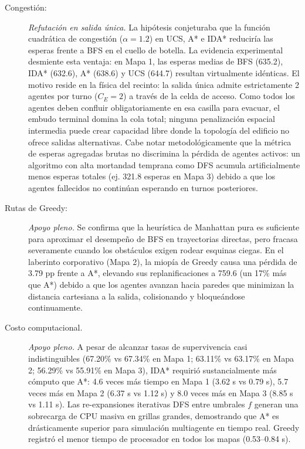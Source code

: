 \documentclass[11pt,letterpaper]{article}
\begin{document}
\begin{description}
\item[Congestión:] \textit{Refutación en salida única.} La hipótesis conjeturaba que la función cuadrática de congestión ($\alpha=1.2$) en UCS, A* e IDA* reduciría las esperas frente a BFS en el cuello de botella. La evidencia experimental desmiente esta ventaja: en Mapa 1, las esperas medias de BFS (635.2), IDA* (632.6), A* (638.6) y UCS (644.7) resultan virtualmente idénticas. El motivo reside en la física del recinto: la salida única admite estrictamente 2 agentes por turno ($C_E=2$) a través de la celda de acceso. Como todos los agentes deben confluir obligatoriamente en esa casilla para evacuar, el embudo terminal domina la cola total; ninguna penalización espacial intermedia puede crear capacidad libre donde la topología del edificio no ofrece salidas alternativas. Cabe notar metodológicamente que la métrica de esperas agregadas brutas no discrimina la pérdida de agentes activos: un algoritmo con alta mortandad temprana como DFS acumula artificialmente menos esperas totales (ej. 321.8 esperas en Mapa 3) debido a que los agentes fallecidos no continúan esperando en turnos posteriores.

\item[Rutas de Greedy:] \textit{Apoyo pleno.} Se confirma que la heurística de Manhattan pura es suficiente para aproximar el desempeño de BFS en trayectorias directas, pero fracasa severamente cuando los obstáculos exigen rodear esquinas ciegas. En el laberinto corporativo (Mapa 2), la miopía de Greedy causa una pérdida de 3.79 pp frente a A*, elevando sus replanificaciones a 759.6 (un 17\% más que A*) debido a que los agentes avanzan hacia paredes que minimizan la distancia cartesiana a la salida, colisionando y bloqueándose continuamente.

\item[Costo computacional.] \textit{Apoyo pleno.} A pesar de alcanzar tasas de supervivencia casi indistinguibles (67.20\% vs 67.34\% en Mapa 1; 63.11\% vs 63.17\% en Mapa 2; 56.29\% vs 55.91\% en Mapa 3), IDA* requirió sustancialmente más cómputo que A*: 4.6 veces más tiempo en Mapa 1 (3.62 s vs 0.79 s), 5.7 veces más en Mapa 2 (6.37 s vs 1.12 s) y 8.0 veces más en Mapa 3 (8.85 s vs 1.11 s). Las re-expansiones iterativas DFS entre umbrales $f$ generan una sobrecarga de CPU masiva en grillas grandes, demostrando que A* es drásticamente superior para simulación multiagente en tiempo real. Greedy registró el menor tiempo de procesador en todos los mapas (0.53--0.84 s).


\end{description}
\end{document}
